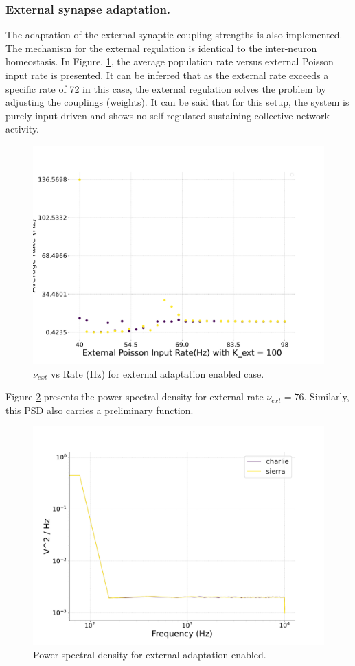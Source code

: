 \documentclass[a4paper,12pt]{article}
\begin{document}
\subsubsection{External synapse adaptation.}
The adaptation of the external synaptic coupling strengths is also implemented. The mechanism for the external regulation is identical to the inter-neuron homeostasis. In Figure, \ref{foxtrot}, the average population rate versus external Poisson input rate is presented. It can be inferred that as the external rate exceeds a specific rate of 72 in this case, the external regulation solves the problem by adjusting the couplings (weights). It can be said that for this setup, the system is purely input-driven and shows no self-regulated sustaining collective network activity.

\begin{figure}[H] 
    \centering
    \includegraphics[width=0.8\linewidth]{nuext_vs_activity_foxtrot.pdf}
    \caption{$\nu_{ext}$ vs Rate (Hz) for external adaptation enabled case.}
    \label{foxtrot}
\end{figure}
Figure \ref{foxtrot76PSD} presents the power spectral density for external rate $\nu_{ext} = 76$. Similarly, this PSD also carries a preliminary function.
\begin{figure}[H] 
    \centering
    \includegraphics[width=0.8\linewidth]{nu_ext_76PSD_homeostasis_foxtrot.pdf}
    \caption{Power spectral density for external adaptation enabled.}
    \label{foxtrot76PSD}
\end{figure}
\end{document}
